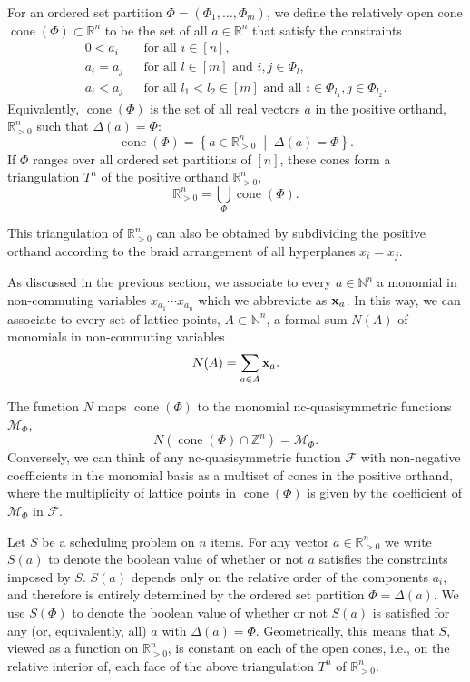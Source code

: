 \documentclass[12pt,reqno]{amsart}
\numberwithin{definition}{section}
\theoremstyle{definition}
\newcommand{\RR}{\mathbb{R}}
\newcommand{\NN}{\mathbb{N}}
\newcommand{\ZZ}{\mathbb{Z}}
\newcommand{\SSS}{\mathcal{S}}
\newcommand{\cone}{\operatorname{cone}}
\newcommand{\mset}[2]{ \left\{ #1 \; \middle| \; #2 \right\}}
\newcommand{\ncM}{\mathcal{M}}
\newcommand{\poly}{\chi} %
\newcommand{\comment}[1]{\textsf{\footnotesize #1}}
\begin{document}
For an ordered set partition $\Phi=(\Phi_1,\ldots,\Phi_m)$, we define the relatively open cone $\cone(\Phi)\subset\RR^n$ to be the set of all $a\in\RR^n$ that satisfy the constraints
\begin{eqnarray*}
0 < a_i && \text{for all $i\in[n]$}, \\
a_i = a_j && \text{for all $l\in[m]$ and $i,j\in\Phi_l$}, \\
a_i < a_j && \text{for all $l_1 < l_2\in[m]$ and all $i\in\Phi_{l_1}, j\in\Phi_{l_2}$}.
\end{eqnarray*}
Equivalently, $\cone(\Phi)$ is the set of all real vectors $a$ in the positive orthand, $\RR_{> 0}^n$ such that $\Delta(a)=\Phi$: 
\[
\cone(\Phi) = \mset{a\in\RR_{> 0}^n}{\Delta(a)=\Phi}.
\]
 If $\Phi$ ranges over all ordered set partitions of $[n]$, these cones form a triangulation $T^n$ of the positive orthand $\RR_{> 0}^n$, 
\[
  \RR_{> 0}^n = \bigcup_\Phi \cone(\Phi).
\]


This triangulation of $\RR_{> 0}^n$ can also be obtained by subdividing the positive orthand according to the braid arrangement of all hyperplanes $x_i=x_j$.

As discussed in the previous section, we associate to every $a\in\NN^n$ a monomial in non-commuting variables $x_{a_1}\cdots x_{a_n}$ which we abbreviate as ${\bf x}_a$. In this way, we can associate to every set of lattice points, $A\subset\NN^n$, a formal sum $N(A)$ of monomials in non-commuting variables
\[
  N(A) = \sum_{a\in A} {\bf x}_a.
\]

The function $N$ maps $\cone(\Phi)$ to the monomial nc-quasisymmetric functions $\ncM_\Phi$,
\[
  N(\cone(\Phi)\cap\ZZ^n) = \ncM_\Phi.
\]
Conversely, we can think of any nc-quasisymmetric function $\mathcal{F}$ with non-negative coefficients in the monomial basis as a multiset of cones in the positive orthand, where the multiplicity of lattice points in $\cone(\Phi)$ is given by the coefficient of $\ncM_\Phi$ in $\mathcal{F}$.






Let $S$ be a scheduling problem on $n$ items. For any vector $a\in\RR^n_{> 0}$ we write $S(a)$ to denote the boolean value of whether or not $a$ satisfies the constraints imposed by $S$.  $S(a)$ depends only on the relative order of the components $a_i$, and therefore is entirely determined by the ordered set partition $\Phi=\Delta(a)$. We use $S(\Phi)$ to denote the boolean value of whether or not $S(a)$ is satisfied for any (or, equivalently, all) $a$ with $\Delta(a)=\Phi$. Geometrically, this means that $S$, viewed as a function on $\RR^n_{>0}$, is constant on each of the open cones, i.e., on the relative interior of, each face of the above triangulation $T^n$ of $\RR^n_{> 0}$.
\end{document}
